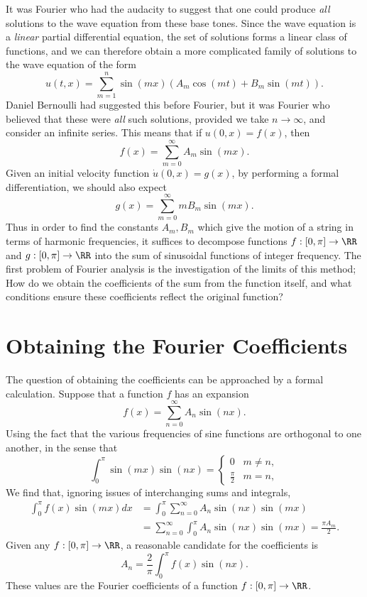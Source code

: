It was Fourier who had the audacity to suggest that one could produce {\it all} solutions to the wave equation from these base tones. Since the wave equation is a {\it linear} partial differential equation, the set of solutions forms a linear class of functions, and we can therefore obtain a more complicated family of solutions to the wave equation of the form
%
\[ u(t,x) = \sum_{m = 1}^n \sin(mx) (A_m \cos(mt) + B_m \sin(mt)). \]
%
Daniel Bernoulli had suggested this before Fourier, but it was Fourier who believed that these were {\it all} such solutions, provided we take $n \to \infty$, and consider an infinite series. This means that if $u(0,x) = f(x)$, then
%
\[ f(x) = \sum_{m = 0}^\infty A_m \sin(mx). \]
%
Given an initial velocity function $\dot{u}(0,x) = g(x)$, by performing a formal differentiation, we should also expect
%
\[ g(x) = \sum_{m = 0}^\infty m B_m \sin(mx). \]
%
Thus in order to find the constants $A_m,B_m$ which give the motion of a string in terms of harmonic frequencies, it suffices to decompose functions $f: [0, \pi] \to \RR$ and $g: [0,\pi] \to \RR$ into the sum of sinusoidal functions of integer frequency. The first problem of Fourier analysis is the investigation of the limits of this method; How do we obtain the coefficients of the sum from the function itself, and what conditions ensure these coefficients reflect the original function?

\section{Obtaining the Fourier Coefficients}

The question of obtaining the coefficients can be approached by a formal calculation. Suppose that a function $f$ has an expansion
%
\[ f(x) = \sum_{n = 0}^\infty A_n \sin(nx). \]
%
Using the fact that the various frequencies of sine functions are orthogonal to one another, in the sense that
%
\[ \int_0^\pi \sin(mx) \sin(nx) = \begin{cases} 0 & m \neq n, \\ \frac{\pi}{2} & m = n, \end{cases} \]
%
We find that, ignoring issues of interchanging sums and integrals,
%
\begin{align*}
    \int_0^\pi f(x) \sin(mx) dx &= \int_0^\pi \sum_{n = 0}^\infty A_n \sin(nx) \sin(mx)\\
    &= \sum_{n = 0}^\infty \int_0^\pi A_n \sin(nx) \sin(mx) = \frac{\pi A_m}{2}.
\end{align*}
%
Given any $f:[0,\pi] \to \RR$, a reasonable candidate for the coefficients is
%
\[ A_n = \frac{2}{\pi} \int_0^\pi f(x) \sin(nx). \]
%
These values are the Fourier coefficients of a function $f: [0,\pi] \to \RR$.

